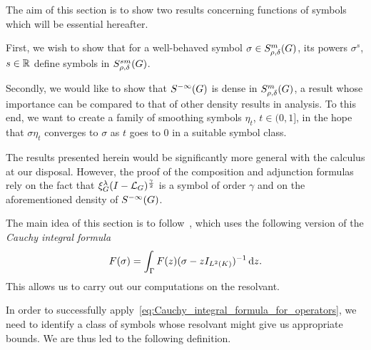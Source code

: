 The aim of this section is to show two results concerning functions of symbols which will be essential hereafter.

First, we wish to show that for a well-behaved symbol $\sigma \in S^{m}_{\rho, \delta}(G)$,
its powers $\sigma^s$, $s \in \mathbb{R}$ define symbols in $S^{s m}_{\rho, \delta}(G)$.

Secondly, we would like to show that ${S^{-\infty} (G)}$ is dense in $S^{m}_{\rho, \delta}(G)$,
a result whose importance can be compared to that of other density results in analysis.
To this end, we want to create a family of smoothing symbols $\eta_t$, $t \in (0, 1]$, in the hope
that $\sigma \eta_t$ converges to $\sigma$ as $t$ goes to $0$ in a suitable symbol class.

The results presented herein would be significantly more general with the calculus at our disposal.
However, the proof of the composition and adjunction formulas rely on the fact that $\xi^{\lambda}_{G} (I - {\mathcal{L}_{G}})^\frac{\gamma}{2}$ is a symbol of order $\gamma$
and on the aforementioned density of ${S^{-\infty} (G)}$.

The main idea of this section is to follow~\cite{RuzhanskyWirth14},
which uses the following version of the \emph{Cauchy integral formula}
\begin{align}
    F(\sigma) = \int_\Gamma F(z) (\sigma - z{I_{{L^{2} (K)}}})^{-1} \,\mathrm{d} z.
    \label{eq:Cauchy_integral_formula_for_operators}
\end{align}
This allows us to carry out our computations on the resolvant.

In order to successfully apply~\eqref{eq:Cauchy_integral_formula_for_operators},
we need to identify a class of symbols whose resolvant might give us appropriate bounds.
We are thus led to the following definition.

